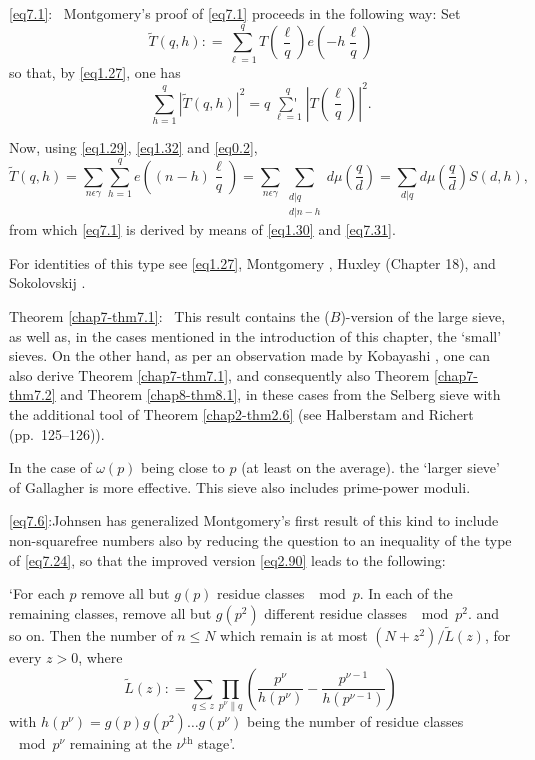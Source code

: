\eqref{eq7.1}:~ Montgomery's \cite{key1} proof of \eqref{eq7.1}
proceeds in the following way: Set  
\begin{equation}
\tilde T (q,h): = \sum^{q}_{\ell =1} T(\frac{\ell}{q})
e(-h\frac{\ell}{q}) \tag{7.30}\label{eq7.30} 
\end{equation}
so that, by \eqref{eq1.27}, one has
\begin{equation}
\sum^{q}_{h=1}|\tilde T (q,h)|^2 = q \mathop{\sum{}'}\limits^{q}_{\ell
  =1}|T(\frac{\ell}{q})|^2. \tag{7.31}\label{eq7.31} 
\end{equation}

Now, using \eqref{eq1.29}, \eqref{eq1.32} and \eqref{eq0.2},
\begin{equation}
\tilde T (q,h) = \sum_{n \epsilon \gamma}\sum^{q}_{h=1}
e((n-h)\frac{\ell}{q})=\sum_{n \epsilon \gamma} \sum_
{\substack{d|q \\ { d|n-h}}} d \mu (\frac{q}{d})= \sum_{d|q} d \mu
(\frac{q}{d}) S(d,h), \tag{7.32}\label{eq7.32} 
\end{equation}
from which \eqref{eq7.1} is derived by means of \eqref{eq1.30} and
\eqref{eq7.31}. 

For identities of this type see \eqref{eq1.27}, Montgomery
\cite{key1}, Huxley \cite{key7} (Chapter 18), and Sokolovskij
\cite{key1}. 


Theorem \ref{chap7-thm7.1}:~
This result contains the ($B$)-version of the large sieve, as well as,
in the cases mentioned in the introduction of this chapter, the
`small' sieves. On the other hand, as per an observation made by
Kobayashi \cite{key1}, one can also derive Theorem \ref{chap7-thm7.1},
and consequently also Theorem \ref{chap7-thm7.2} and Theorem
\ref{chap8-thm8.1}, in these cases from the Selberg sieve with the
additional tool of Theorem \ref{chap2-thm2.6} (see Halberstam and
Richert \cite{key1} (pp.~125--126)). 

In the case of $\omega(p)$ being close to $p$ (at least on the
average). the `larger sieve' of Gallagher \cite{key3} is more
effective. This sieve also includes prime-power moduli. 

\eqref{eq7.6}:\pageoriginale Johnsen \cite{key1} has generalized Montgomery's
  \cite{key1} first result of this kind to include non-squarefree
  numbers also by 
  reducing the question to an inequality of the type of \eqref{eq7.24}, so
  that the improved version \eqref{eq2.90} leads to the following:

`For each $p$ remove all but $g(p)$ residue classes $\mod p$. In each
  of the remaining classes, remove all but $g(p^2)$ different residue
  classes $\mod p^2$. and so on. Then the number of $n \leq N$ which
  remain is at most $(N+z^2)/\tilde{L} (z)$, for every $z > 0$, where  
\begin{equation}
\tilde{L}(z): = \sum_{q \leq z} \prod_{p^\nu \parallel q}(
\frac{p^\nu}{h(p^\nu)}- \frac{p^{\nu-1}}{h(p^{\nu-1})})
\tag{7.33}\label{eq7.33}  
\end{equation}
with $h(p^\nu) =g(p)g(p^2) \ldots g(p^\nu)$ being the number of
residue classes $\mod p^\nu$ remaining at the $\nu^{\text{th}}$ stage'. 

